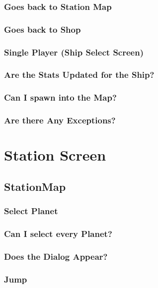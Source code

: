 \documentclass[11pt]{article}
\begin{document}
\subsubsection{Goes back to Station Map}
\subsubsection{Goes back to Shop}


\subsubsection{Single Player (Ship Select Screen)}

\subsubsection{Are the Stats Updated for the Ship?}
\subsubsection{Can I spawn into the Map?}
\subsubsection{Are there Any Exceptions?}



\section{Station Screen}
\label{sec:orga891bce}

\subsection{StationMap}

\subsubsection{Select Planet}

\subsubsection{Can I select every Planet?}
\subsubsection{Does the Dialog Appear?}
\subsubsection{ Jump}
\end{document}
